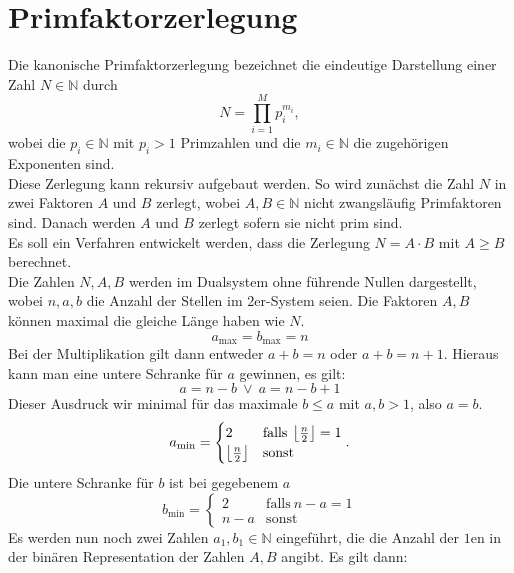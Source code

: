 \section{Primfaktorzerlegung}
Die kanonische Primfaktorzerlegung bezeichnet die eindeutige Darstellung einer Zahl $N\in\mathbb{N}$ durch
\begin{equation*}
  N=\prod\limits_{i=1}^M p_i^{m_i},
\end{equation*}
wobei die $p_i\in\mathbb{N}$ mit $p_i>1$ Primzahlen und die $m_i\in\mathbb{N}$ die zugehörigen Exponenten sind.\\
Diese Zerlegung kann rekursiv aufgebaut werden. So wird zunächst die Zahl $N$ in zwei Faktoren $A$ und $B$ zerlegt, wobei $A,B\in\mathbb{N}$ nicht zwangsläufig Primfaktoren sind. Danach werden $A$ und $B$ zerlegt sofern sie nicht prim sind.\\
Es soll ein Verfahren entwickelt werden, dass die Zerlegung $N=A\cdot B$ mit $A\geq B$ berechnet.\\
Die Zahlen $N,A,B$ werden im Dualsystem ohne führende Nullen dargestellt, wobei $n, a, b$ die Anzahl der Stellen im $2$er-System seien. Die Faktoren $A, B$ können maximal die gleiche Länge haben wie $N$.
\begin{equation*}
		a_\mathrm{max}=b_\mathrm{max}=n
\end{equation*}
Bei der Multiplikation gilt dann entweder $a+b=n$ oder $a+b=n+1$. Hieraus kann man eine untere Schranke für $a$ gewinnen, es gilt:
\begin{equation*}
		a=n-b \:\vee\: a=n-b+1
\end{equation*}
Dieser Ausdruck wir minimal für das maximale $b \leq a$ mit $a,b>1$, also $a=b$.
\begin{equation*}
		a_\mathrm{min}=\begin{cases}
						2 & \mathrm{falls}\:\left\lfloor\frac{n}{2}\right\rfloor = 1 \\
						\left\lfloor\frac{n}{2}\right\rfloor & \mathrm{sonst}
				\end{cases}.
\end{equation*}
Die untere Schranke für $b$ ist bei gegebenem $a$
\begin{equation*}
		b_\mathrm{min}=\begin{cases}
						2 & \mathrm{falls}\:n-a=1 \\
						n-a & \mathrm{sonst}
				\end{cases}
\end{equation*}
Es werden nun noch zwei Zahlen $a_1, b_1\in\mathbb{N}$ eingeführt, die die Anzahl der $1$en in der binären Representation der Zahlen $A, B$ angibt. Es gilt dann:
